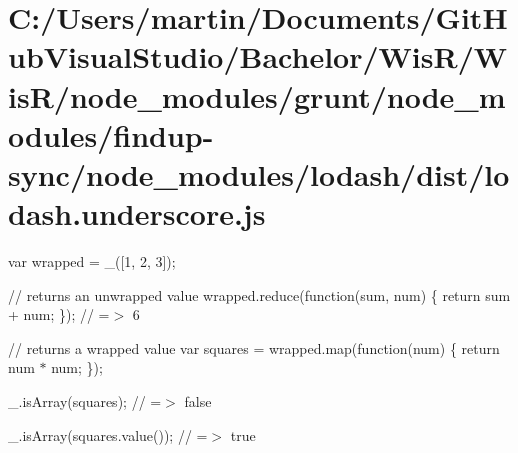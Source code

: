 \hypertarget{_c_1_2_users_2martin_2_documents_2_git_hub_visual_studio_2_bachelor_2_wis_r_2_wis_r_2node_modulec178e91b2f078ea23874f1bf402258fc}{}\section{C\+:/\+Users/martin/\+Documents/\+Git\+Hub\+Visual\+Studio/\+Bachelor/\+Wis\+R/\+Wis\+R/node\+\_\+modules/grunt/node\+\_\+modules/findup-\/sync/node\+\_\+modules/lodash/dist/lodash.\+underscore.\+js}
var wrapped = \+\_\+(\mbox{[}1, 2, 3\mbox{]});

// returns an unwrapped value wrapped.\+reduce(function(sum, num) \{ return sum + num; \}); // =$>$ 6

// returns a wrapped value var squares = wrapped.\+map(function(num) \{ return num $\ast$ num; \});

\+\_\+.\+is\+Array(squares); // =$>$ false

\+\_\+.\+is\+Array(squares.\+value()); // =$>$ true


